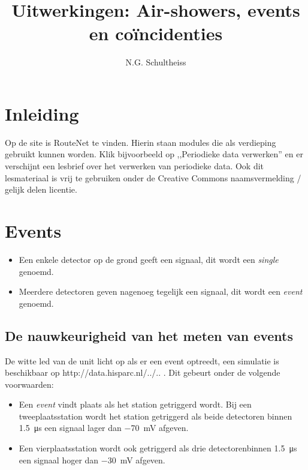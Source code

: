 



\title{Uitwerkingen: Air-showers, events en coïncidenties}
\author{N.G. Schultheiss}

\maketitle

\section{Inleiding}

Op de \hisparc site is RouteNet te vinden. Hierin staan modules die
als verdieping gebruikt kunnen worden. Klik bijvoorbeeld op ,,Periodieke
data verwerken'' en er verschijnt een lesbrief over het verwerken
van periodieke data. Ook dit lesmateriaal is vrij te gebruiken onder
de Creative Commons naamsvermelding / gelijk delen licentie.


\section{Events}

\begin{itemize}
    \item Een enkele detector op de grond geeft een signaal, dit wordt
    een \emph{single} genoemd. 
    \item Meerdere detectoren geven nagenoeg tegelijk een signaal, dit
    wordt een \emph{event} genoemd. 
\end{itemize}

\subsection{De nauwkeurigheid van het meten van events}

De witte led van de \hisparc unit licht op als er een event optreedt,
een simulatie is beschikbaar op http://data.hisparc.nl/../.. . Dit
gebeurt onder de volgende voorwaarden:

\begin{itemize}
    \item Een \textit{event} vindt plaats als het station getriggerd
    wordt. Bij een tweeplaatsstation wordt het station getriggerd als
    beide detectoren binnen \SI{1,5}{\micro\second} een signaal lager
    dan \SI{-70}{\milli\volt} afgeven. 
    \item Een vierplaatsstation wordt ook getriggerd als drie
    detectorenbinnen \SI{1,5}{\micro\second} een signaal hoger dan
    \SI{-30}{\milli\volt} afgeven. 
\end{itemize}

